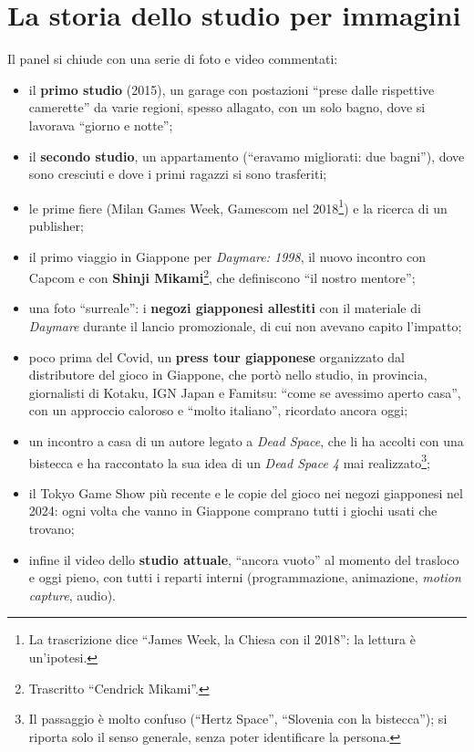 \section{La storia dello studio per immagini}
\label{sec:c1-3-foto}

Il panel si chiude con una serie di foto e video commentati:
\begin{itemize}
  \item il \textbf{primo studio} (2015), un garage con postazioni ``prese dalle
        rispettive camerette'' da varie regioni, spesso allagato, con un solo
        bagno, dove si lavorava ``giorno e notte'';
  \item il \textbf{secondo studio}, un appartamento (``eravamo migliorati: due
        bagni''), dove sono cresciuti e dove i primi ragazzi si sono
        trasferiti;
  \item le prime fiere (Milan Games Week, Gamescom nel 2018\footnote{La
        trascrizione dice ``James Week, la Chiesa con il 2018'': la lettura è
        un'ipotesi.}) e la ricerca di un publisher;
  \item il primo viaggio in Giappone per \emph{Daymare: 1998}, il nuovo incontro
        con Capcom e con \textbf{Shinji Mikami}\footnote{Trascritto ``Cendrick
        Mikami''.}, che definiscono ``il nostro mentore'';
  \item una foto ``surreale'': i \textbf{negozi giapponesi allestiti} con il
        materiale di \emph{Daymare} durante il lancio promozionale, di cui non
        avevano capito l'impatto;
  \item poco prima del Covid, un \textbf{press tour giapponese} organizzato dal
        distributore del gioco in Giappone, che portò nello studio, in provincia,
        giornalisti di Kotaku, IGN Japan e Famitsu: ``come se avessimo aperto
        casa'', con un approccio caloroso e ``molto italiano'', ricordato ancora
        oggi;
  \item un incontro a casa di un autore legato a \emph{Dead Space}, che li ha
        accolti con una bistecca e ha raccontato la sua idea di un
        \emph{Dead Space 4} mai realizzato\footnote{Il passaggio è molto
        confuso (``Hertz Space'', ``Slovenia con la bistecca''); si riporta solo
        il senso generale, senza poter identificare la persona.};
  \item il Tokyo Game Show più recente e le copie del gioco nei negozi
        giapponesi nel 2024: ogni volta che vanno in Giappone comprano tutti i
        giochi usati che trovano;
  \item infine il video dello \textbf{studio attuale}, ``ancora vuoto'' al
        momento del trasloco e oggi pieno, con tutti i reparti interni
        (programmazione, animazione, \emph{motion capture}, audio).
\end{itemize}

